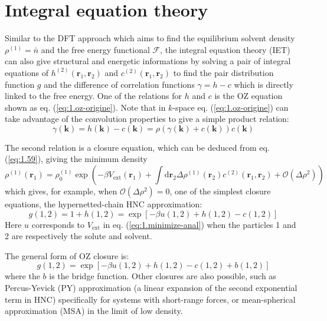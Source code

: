 \section{Integral equation theory}

Similar to the \acs{DFT} approach which aims to find the equilibrium
solvent density $\rho^{(1)}=\bar{n}$ and the free energy functional
$\mathcal{F}$, the integral equation theory (\acs{IET}) can also
give structural and energetic informations by solving a pair of integral
equations of $h^{(2)}(\mathbf{r}_{1},\mathbf{r}_{2})$ and $c^{(2)}(\mathbf{r}_{1},\mathbf{r}_{2})$
to find the pair distribution function $g$ and the difference of
correlation functions $\gamma=h-c$ which is directly linked to the
free energy. One of the relations for $h$ and $c$ is the \acs{OZ}
equation shown as eq. (\ref{eq:1.oz-origine}). Note that in $k$-space
eq. (\ref{eq:1.oz-origine}) can take advantage of the convolution
properties to give a simple product relation:
\begin{equation}
\gamma(\mathbf{k})=h(\mathbf{k})-c(\mathbf{k})=\rho\left(\gamma(\mathbf{k})+c(\mathbf{k})\right)c(\mathbf{k})\label{eq:3.oz-k}
\end{equation}

The second relation is a closure equation, which can be deduced from
eq. (\ref{eq:1.59}), giving the minimum density
\begin{equation}
\rho^{(1)}(\mathbf{r}_{1})=\rho_{0}^{(1)}\exp\left(-\beta V_{\mathrm{ext}}(\mathbf{r}_{1})+\int\mathrm{d}\mathbf{\mathbf{r}}_{2}\Delta\rho^{(1)}(\mathbf{r}_{2})c^{(2)}(\mathbf{r}_{1},\mathbf{r}_{2})+\mathcal{O}(\Delta\rho{}^{2})\right)\label{eq:1.minimize-anal}
\end{equation}
which gives, for example, when $\mathcal{O}(\Delta\rho{}^{2})=0$,
one of the simplest closure equations, the hypernetted-chain \acs{HNC}
approximation:
\begin{equation}
g(1,2)=1+h(1,2)=\exp\left[-\beta u(1,2)+h(1,2)-c(1,2)\right]
\end{equation}
Here $u$ corresponds to $V_{\mathrm{ext}}$ in eq. (\ref{eq:1.minimize-anal})
when the particles 1 and 2 are respectively the solute and solvent.

The general form of \acs{OZ} closure is:
\begin{equation}
g(1,2)=\exp\left[-\beta u(1,2)+h(1,2)-c(1,2)+b(1,2)\right]
\end{equation}
where the $b$ is the bridge function. Other closures are also possible,
such as Percus-Yevick (PY) approximation (a linear expansion of the
second exponential term in \acs{HNC}) specifically for systems with
short-range forces, or mean-spherical approximation (MSA) in the limit
of low density.

